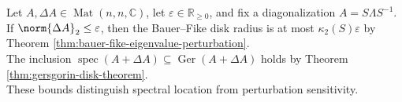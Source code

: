 Let $A,\Delta A\in\operatorname{Mat}(n,n,\mathbb{C})$, let $\varepsilon\in\mathbb{R}_{\geq0}$, and fix a diagonalization $A=S\Lambda S^{-1}$.\\
If $\norm{\Delta A}_2\leq\varepsilon$, then the Bauer--Fike disk radius is at most $\kappa_2(S)\varepsilon$ by Theorem \ref{thm:bauer-fike-eigenvalue-perturbation}.\\
The inclusion $\operatorname{spec}(A+\Delta A)\subseteq\operatorname{Ger}(A+\Delta A)$ holds by Theorem \ref{thm:gersgorin-disk-theorem}.\\
These bounds distinguish spectral location from perturbation sensitivity.
